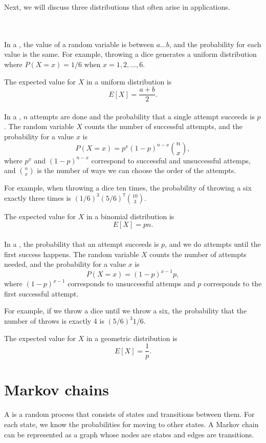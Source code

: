 Next, we will discuss three distributions that
often arise in applications.

~\\\\
In a ,
the value of a random variable is
between $a \ldots b$, and the probability
for each value is the same.
For example, throwing a dice generates
a uniform distribution where
$P(X=x)=1/6$ when $x=1,2,\ldots,6$.

The expected value for $X$ in a uniform distribution is
\[E[X] = \frac{a+b}{2}.\]
~\\
In a , $n$ attempts
are done
and the probability that a single attempt succeeds
is $p$.
The random variable $X$ counts the number of
successful attempts,
and the probability for a value $x$ is
\[P(X=x)=p^x (1-p)^{n-x} {n \choose x},\]
where $p^x$ and $(1-p)^{n-x}$ correspond to
successful and unsuccessful attemps,
and ${n \choose x}$ is the number of ways
we can choose the order of the attempts.

For example, when throwing a dice ten times,
the probability of throwing a six exactly
three times is $(1/6)^3 (5/6)^7 {10 \choose 3}$.

The expected value for $X$ in a binomial distribution is
\[E[X] = pn.\]
~\\
In a ,
the probability that an attempt succeeds is $p$,
and we do attempts until the first success happens.
The random variable $X$ counts the number
of attempts needed, and the probability for
a value $x$ is
\[P(X=x)=(1-p)^{x-1} p,\]
where $(1-p)^{x-1}$ corresponds to unsuccessful attemps
and $p$ corresponds to the first successful attempt.

For example, if we throw a dice until we throw a six,
the probability that the number of throws
is exactly 4 is $(5/6)^3 1/6$.

The expected value for $X$ in a geometric distribution is
\[E[X]=\frac{1}{p}.\]

\section{Markov chains}


A  is a random process
that consists of states and transitions between them.
For each state, we know the probabilities
for moving to other states.
A Markov chain can be represented as a graph
whose nodes are states and edges are transitions.

